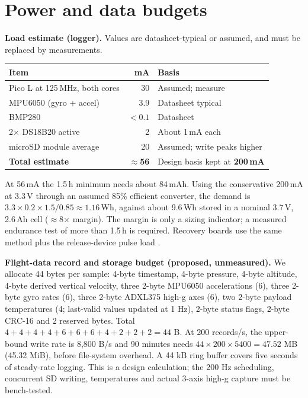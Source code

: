 \section{Power and data budgets}
\label{sec:power}
\textbf{Load estimate (logger).} Values are datasheet-typical or assumed, and must be replaced by measurements.

\small
{}
\begin{tabularx}{\linewidth}{@{}L{48mm}r Y@{}}
\toprule{}\textbf{Item}&\textbf{mA}&\textbf{Basis}\\\midrule
Pico L at 125\,MHz, both cores & 30 & Assumed; measure \cite{rp2040ds}\\
MPU6050 (gyro + accel) & 3.9 & Datasheet typical \cite{mpu6050ds}\\
BMP280 & $<0.1$ & Datasheet \cite{bmp280ds}\\
2$\times$ DS18B20 active & 2 & About 1\,mA each \cite{ds18b20ds}\\
microSD module average & 20 & Assumed; write peaks higher\\
\midrule
\textbf{Total estimate} & \textbf{$\approx$56} & Design basis kept at \textbf{200\,mA}\\
\bottomrule
\end{tabularx}
\normalsize

At 56\,mA the 1.5\,h minimum \cite{rtc2027app03} needs about 84\,mAh. Using the conservative 200\,mA at 3.3\,V through an assumed 85\% efficient converter, the demand is $3.3\times0.2\times1.5/0.85\approx1.16$\,Wh, against about 9.6\,Wh stored in a nominal 3.7\,V, 2.6\,Ah cell ($\approx$8$\times$ margin). The margin is only a sizing indicator; a measured endurance test of more than 1.5\,h is required. Recovery boards use the same method plus the release-device pulse load .

\textbf{Flight-data record and storage budget (proposed, unmeasured).} We allocate 44 bytes per sample: 4-byte timestamp, 4-byte pressure, 4-byte altitude, 4-byte derived vertical velocity, three 2-byte MPU6050 accelerations (6), three 2-byte gyro rates (6), three 2-byte ADXL375 high-g axes (6), two 2-byte payload temperatures (4; last-valid values updated at 1 Hz), 2-byte status flags, 2-byte CRC-16 and 2 reserved bytes. Total $4+4+4+4+6+6+6+4+2+2+2=44$ B. At 200 records/s, the upper-bound write rate is 8,800 B/s and 90 minutes needs $44\times200\times5400=47.52$ MB (45.32 MiB), before file-system overhead. A 44 kB ring buffer covers five seconds of steady-rate logging. This is a design calculation; the 200 Hz scheduling, concurrent SD writing, temperatures and actual 3-axis high-g capture must be bench-tested.

